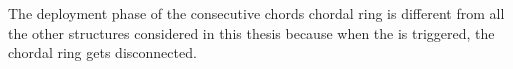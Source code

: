 The deployment phase of the consecutive chords chordal ring is different from all the other structures considered in this thesis because when the \bv is triggered, the chordal ring gets disconnected. 
 
%
%
%



